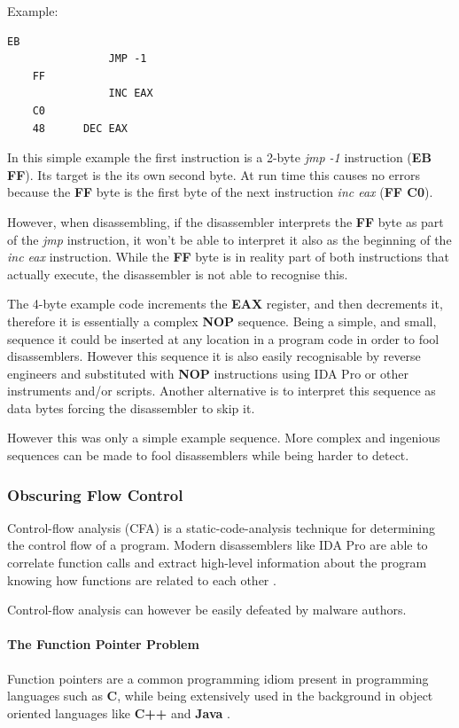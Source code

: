 \documentclass[pdfa%
,cucitura%
]{toptesi}
\begin{document}
Example:
\begin{lstlisting}[caption={Impossible Disassembly example}, label=code:ImpossibleDisassembly, language={[x86masm]Assembler}, style=mystyle]
	EB 
				JMP -1
	FF
				INC EAX
	C0
	48		DEC EAX
\end{lstlisting}

In this simple example the first instruction is a 2-byte \textit{jmp -1} instruction (\textbf{EB FF}). Its target is the its own second byte. At run time this causes no errors because the \textbf{FF} byte is the first byte of the next instruction \textit{inc eax} (\textbf{FF C0}).

However, when disassembling, if the disassembler interprets the \textbf{FF} byte as part of the \textit{jmp} instruction, it won't be able to interpret it also as the beginning of the \textit{inc eax} instruction. While the \textbf{FF} byte is in reality part of both instructions that actually execute, the disassembler is not able to recognise this.

The 4-byte example code increments the \textbf{EAX} register, and then decrements it, therefore it is essentially a complex \textbf{NOP} sequence. Being a simple, and small, sequence it could be inserted at any location in a program code in order to fool disassemblers. However this sequence it is also easily recognisable by reverse engineers and substituted with \textbf{NOP} instructions using IDA Pro or other instruments and/or scripts. Another alternative is to interpret this sequence as data bytes forcing the disassembler to skip it.

However this was only a simple example sequence. More complex and ingenious sequences can be made to fool disassemblers while being harder to detect.

\subsubsection{Obscuring Flow Control}
Control-flow analysis (CFA) is a static-code-analysis technique for determining the control flow of a program. Modern disassemblers like IDA Pro are able to correlate function calls and extract high-level information about the program knowing how functions are related to each other \cite{SikorskiPMA}.

Control-flow analysis can however be easily defeated by malware authors.

\paragraph{The Function Pointer Problem}
Function pointers are a common programming idiom present in programming languages such as \textbf{C}, while being extensively used in the background in object oriented languages like \textbf{C++} and \textbf{Java} \cite{SikorskiPMA}.
\end{document}
